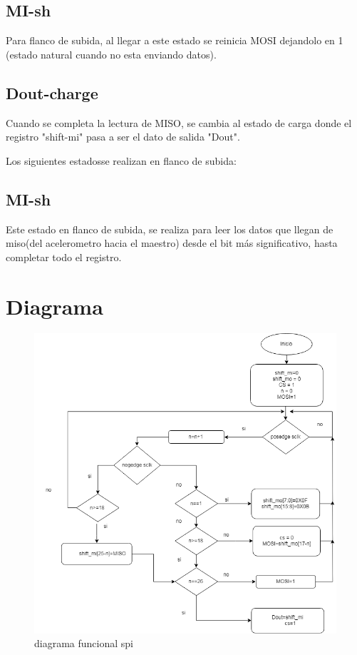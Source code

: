 \documentclass{article}
\begin{document}
\subsection{MI-sh}

Para flanco de subida, al llegar a este estado se reinicia MOSI dejandolo en 1 (estado natural cuando no esta enviando datos).

\subsection{Dout-charge}

Cuando se completa la lectura de MISO, se cambia al estado de carga donde el registro "shift-mi" pasa a ser el dato de salida "Dout".

Los siguientes estadosse realizan en flanco de subida:

\subsection{MI-sh}

Este estado en flanco de subida, se realiza para leer los datos que llegan de miso(del acelerometro hacia el maestro) desde el bit más significativo, hasta completar todo el registro.

\section{Diagrama}

\begin{figure}[H]

\includegraphics[scale=0.5]{3.png}
\caption{diagrama funcional spi}
\label{imagen 1}
\end{figure}
\end{document}

